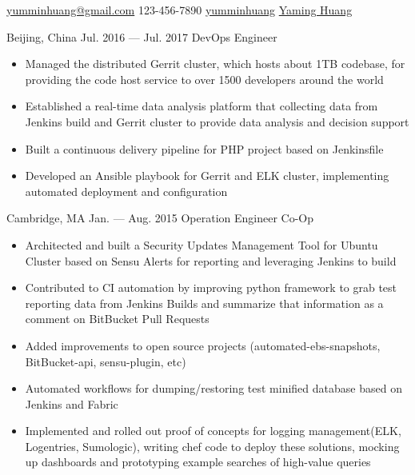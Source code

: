 \documentclass{resume}
\begin{document}
{\href{mailto:yumminhuang@gmail.com}{yumminhuang@gmail.com}}
{123-456-7890}
{\href{https://github.com/yumminhuang}{yumminhuang}}
{\href{https://www.linkedin.com/in/yaming-huang-6a09325b}{Yaming Huang}}
{}


\begin{body}
	{Beijing, China}
	{Jul. 2016 --- Jul. 2017}
	{DevOps Engineer}
	\begin{itemize}[noitemsep,topsep=0pt]
		\item Managed the distributed Gerrit cluster, which hosts about 1TB codebase, for providing the code host service to over 1500 developers around the world
		\item Established a real-time data analysis platform that collecting data from Jenkins build and Gerrit cluster to provide data analysis and decision support
		\item Built a continuous delivery pipeline for PHP project based on Jenkinsfile
		\item Developed an Ansible playbook for Gerrit  and ELK cluster, implementing automated deployment and configuration
	\end{itemize}
\end{body}

\begin{body}
	{Cambridge, MA}
	{Jan. --- Aug. 2015}
	{Operation Engineer Co-Op}
	\begin{itemize}[noitemsep,topsep=0pt]
		\item Architected and built a Security Updates Management Tool for Ubuntu Cluster based on Sensu Alerts for reporting and leveraging Jenkins to build
		\item Contributed to CI automation by improving python framework to grab test reporting data from Jenkins Builds and summarize that information as a comment on BitBucket Pull Requests
		\item Added improvements to open source projects (automated-ebs-snapshots, BitBucket-api, sensu-plugin, etc)
		\item Automated workflows for dumping/restoring test minified database based on Jenkins and Fabric
		\item Implemented and rolled out proof of concepts for logging management(ELK, Logentries, Sumologic), writing chef code to deploy these solutions, mocking up dashboards and prototyping example searches of high-value queries
	\end{itemize}
\end{body}
\end{document}
